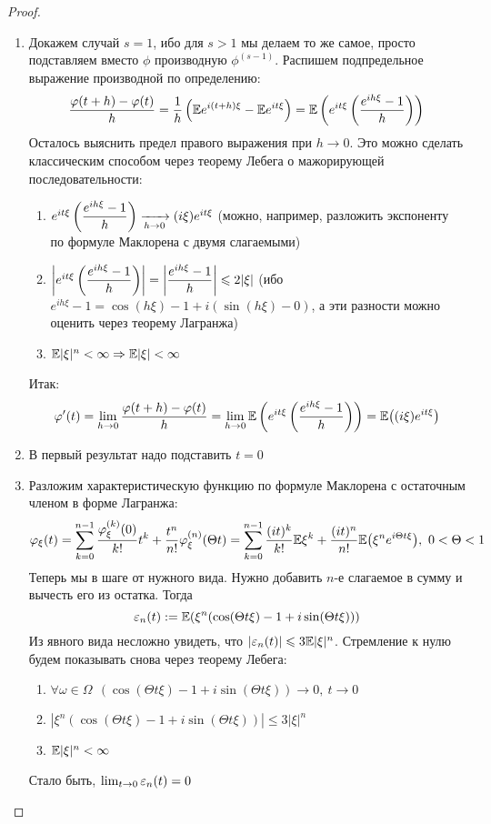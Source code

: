 \begin{proof}~
	\begin{enumerate}
		\item Докажем случай $s = 1$, ибо для $s > 1$ мы делаем то же самое, просто подставляем вместо $\phi$ производную $\phi^{(s - 1)}$. Распишем подпредельное выражение производной по определению:
		\[
			\frac{\varphi(t + h) - \varphi(t)}{h} = \frac{1}{h}\left(\mathbb{E} e^{i(t + h)\xi} - \mathbb{E} e^{it\xi}\right) = \mathbb{E}\left(e^{it\xi} \left(\frac{e^{ih\xi} - 1}{h}\right)\right)
		\]
		Осталось выяснить предел правого выражения при $h \to 0$. Это можно сделать классическим способом через теорему Лебега о мажорирующей последовательности:
		\begin{enumerate}
			\item $e^{it\xi}\left(\dfrac{e^{ih\xi} - 1}{h}\right) \xrightarrow[h \to 0]{} (i\xi)e^{it\xi}$ (можно, например, разложить экспоненту по формуле Маклорена с двумя слагаемыми)
			
			\item $\left|e^{it\xi}\left(\dfrac{e^{ih\xi} - 1}{h}\right)\right| = \left|\dfrac{e^{ih\xi} - 1}{h}\right| \leqslant 2|\xi|$ (ибо $e^{ih\xi} - 1 = \cos(h\xi) - 1 + i(\sin(h\xi) - 0)$, а эти разности можно оценить через теорему Лагранжа)
			
			\item $\mathbb{E} |\xi|^n < \infty \Rightarrow \mathbb{E}|\xi| < \infty$
		\end{enumerate}
		Итак:
		\[
			\varphi'(t) = \lim_{h \to 0} \frac{\varphi(t + h) - \varphi(t)}{h} = \lim_{h \to 0} \mathbb{E}\left(e^{it\xi}\left(\frac{e^{ih\xi} - 1}{h}\right)\right) = \mathbb{E}\big((i\xi)e^{it\xi}\big)
		\]
		
		\item В первый результат надо подставить $t = 0$
		
		\item Разложим характеристическую функцию по формуле Маклорена с остаточным членом в форме Лагранжа:
		\[
			\varphi_\xi(t) = \sum_{k = 0}^{n - 1} \frac{\varphi_\xi^{(k)}(0)}{k!} t^k + \frac{t^n}{n!}\varphi_\xi^{(n)}(\Theta t) = \sum_{k = 0}^{n - 1} \frac{(it)^k}{k!} \mathbb{E}\xi^k + \frac{(it)^n}{n!} \mathbb{E}\big(\xi^n e^{i\Theta t\xi}\big),\ 0 < \Theta < 1
		\]
		Теперь мы в шаге от нужного вида. Нужно добавить $n$-е слагаемое в сумму и вычесть его из остатка. Тогда
		\[
			\varepsilon_n(t) := \mathbb{E}(\xi^n (\cos(\Theta t\xi) - 1 + i\sin(\Theta t\xi)))
		\]
		Из явного вида несложно увидеть, что $|\varepsilon_n(t)| \leqslant 3\mathbb{E}|\xi|^n$. Стремление к нулю будем показывать снова через теорему Лебега:
		\begin{enumerate}
			\item $\forall \omega \in \Omega\ \ (\cos(\Theta t\xi) - 1 + i\sin(\Theta t\xi)) \to 0,\ t \to 0$
			
			\item $|\xi^n (\cos(\Theta t\xi) - 1 + i\sin(\Theta t\xi))| \le 3|\xi|^n$
			
			\item $\mathbb{E} |\xi|^n < \infty$
		\end{enumerate}
		Стало быть, $\lim_{t \to 0} \varepsilon_n(t) = 0$
	\end{enumerate}
\end{proof}

